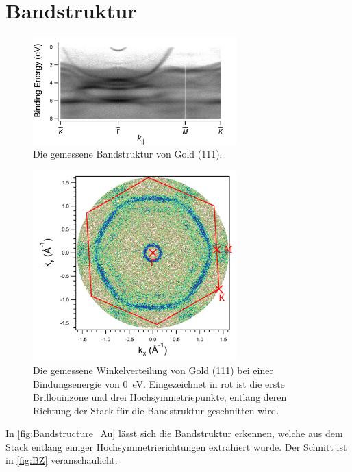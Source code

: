     \section{Bandstruktur}
        \begin{figure}
            \centering
            \includegraphics[width=0.7\textwidth]{./content/Bandstructure_Au111.png}
            \caption{Die gemessene Bandstruktur von Gold (111).}
            \label{fig:Bandstructure_Au}
        \end{figure}
        \begin{figure}
            \centering
            \includegraphics[width=0.7\textwidth]{./content/BZ}
            \caption{Die gemessene Winkelverteilung von Gold (111) bei einer Bindungsenergie von \SI{0}{\electronvolt}.
            Eingezeichnet in rot ist die erste Brillouinzone und drei Hochsymmetriepunkte, entlang deren Richtung der Stack für die Bandstruktur geschnitten wird.}
            \label{fig:BZ}
        \end{figure}
        In \autoref{fig:Bandstructure_Au} lässt sich die Bandstruktur erkennen, welche aus dem Stack entlang einiger Hochsymmetrierichtungen extrahiert wurde.
        Der Schnitt ist in \autoref{fig:BZ} veranschaulicht.


